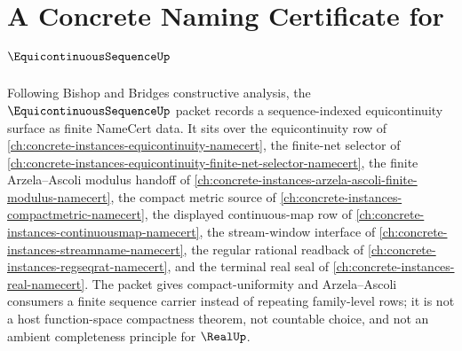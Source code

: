 \chapter{A Concrete Naming Certificate for $\EquicontinuousSequenceUp$}
\label{ch:concrete-instances-equicontinuous-sequence-namecert}

Following Bishop and Bridges constructive analysis, the $\EquicontinuousSequenceUp$ packet records a sequence-indexed equicontinuity surface as finite NameCert data. It sits over the equicontinuity row of \autoref{ch:concrete-instances-equicontinuity-namecert}, the finite-net selector of \autoref{ch:concrete-instances-equicontinuity-finite-net-selector-namecert}, the finite Arzela--Ascoli modulus handoff of \autoref{ch:concrete-instances-arzela-ascoli-finite-modulus-namecert}, the compact metric source of \autoref{ch:concrete-instances-compactmetric-namecert}, the displayed continuous-map row of \autoref{ch:concrete-instances-continuousmap-namecert}, the stream-window interface of \autoref{ch:concrete-instances-streamname-namecert}, the regular rational readback of \autoref{ch:concrete-instances-regseqrat-namecert}, and the terminal real seal of \autoref{ch:concrete-instances-real-namecert}. The packet gives compact-uniformity and Arzela--Ascoli consumers a finite sequence carrier instead of repeating family-level rows; it is not a host function-space compactness theorem, not countable choice, and not an ambient completeness principle for $\RealUp$.


